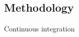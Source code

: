 \documentclass{beamer}
\begin{document}
\subsection{Methodology}
\begin{frame}{Continuous integration}
\begin{center}
\noindent{}
\end{center}
\end{frame}
\end{document}
